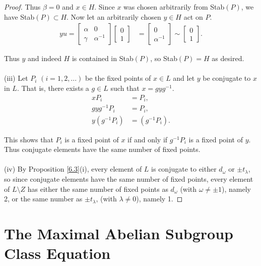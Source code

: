 \documentclass[a4paper , 11pt]{book}
\theoremstyle{definition}
\theoremstyle{remark}
\begin{document}
\begin{proof}
Thus $\beta = 0$ and $x \in H$. Since $x$ was chosen arbitrarily from Stab$(P)$, we have Stab$(P) \subset H$. Now let an arbitrarily chosen $y \in H$ act on $P$. \\
\begin{align*} y u = \begin{bmatrix} \alpha & 0 \\ \gamma & \alpha^{-1} \end{bmatrix} \begin{bmatrix} 0 \\ 1 \end{bmatrix} &= \begin{bmatrix} 0 \\ \alpha^{-1} \end{bmatrix} \sim \begin{bmatrix} 0 \\ 1 \end{bmatrix}.
\end{align*}

Thus $y$ and indeed $H$ is contained in Stab$(P)$, so Stab$(P) = H$ as desired. \\
\\
(iii) Let $P_i$ $(i = 1,2,...)$ be the fixed points of $x\in L$ and let $y$ be conjugate to $x$ in $L$. That is, there exists a $g \in L$ such that $x = gyg^{-1}$.
\begin{align*} x P_i &= P_i,
\\ gyg^{-1} P_i &= P_i,
\\ y(g^{-1} P_i) &= (g^{-1} P_i).
\end{align*}

This shows that $P_i$ is a fixed point of $x$ if and only if $g^{-1} P_i$ is a fixed point of $y$. Thus conjugate elements have the same number of fixed points. \\
\\
(iv) By Proposition \ref{6.3}(i), every  element of $L$ is conjugate to either $d_\omega$ or $\pm t_\lambda$, so since conjugate elements have the same number of fixed points, every element of $L \! \setminus \! Z$ has either the same number of fixed points as $d_\omega$ (with $\omega \neq \pm 1$), namely 2, or the same number as $\pm t_\lambda$, (with $\lambda \neq 0$), namely 1.

\end{proof}

\chapter[The Maximal Abelian Subgroup Class Equation]{The Maximal Abelian Subgroup Class Equation}
\end{document}
